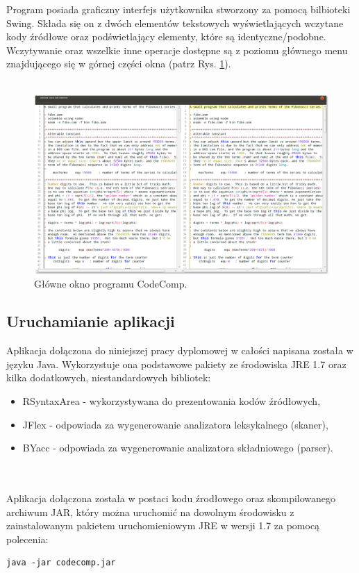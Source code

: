 \documentclass[a4paper,12pt]{article}
\begin{document}
\pagebreak

Program posiada graficzny interfejs użytkownika stworzony za pomocą bilbioteki Swing. Składa się on z dwóch elementów tekstowych wyświetlających wczytane kody źródłowe oraz podświetlający elementy, które są identyczne/podobne. Wczytywanie oraz wszelkie inne operacje dostępne są z poziomu głównego menu znajdującego się w górnej części okna (patrz Rys. \ref{fig:main}).
\\ \\
\begin{figure}[!h]
\centering
\includegraphics[scale=0.33]{gfx/main_window.png}
\caption{Główne okno programu CodeComp.}
\label{fig:main}
\end{figure}

\newpage

\subsection{Uruchamianie aplikacji}

Aplikacja dołączona do niniejszej pracy dyplomowej w całości napisana została w języku Java. Wykorzystuje ona podstawowe pakiety ze środowiska JRE 1.7 oraz kilka dodatkowych, niestandardowych bibliotek:
\begin{itemize}
\item RSyntaxArea - wykorzystywana do prezentowania kodów źródłowych,
\item JFlex - odpowiada za wygenerowanie analizatora leksykalnego (skaner),
\item BYacc - odpowiada za wygenerowanie analizatora składniowego (parser).
\end{itemize}
\\ \\
Aplikacja dołączona została w postaci kodu źrodłowego oraz skompilowanego archiwum JAR, który można uruchomić na dowolnym środowisku z zainstalowanym pakietem uruchomieniowym JRE w wersji 1.7 za pomocą polecenia:
\\
\begin{lstlisting}[numbers=none, xleftmargin=0]
java -jar codecomp.jar
\end{lstlisting}
\end{document}
